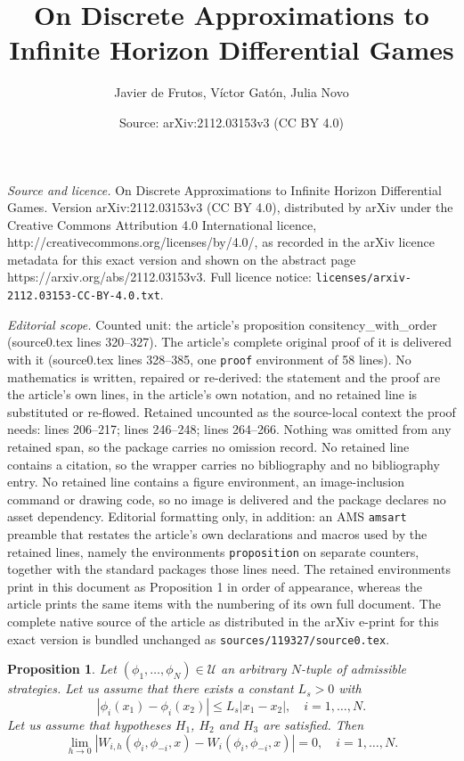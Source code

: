 \documentclass[10pt,a4paper]{amsart}
\title{On Discrete Approximations to Infinite Horizon Differential Games}
\author{Javier de Frutos, V\'ictor Gat\'on, Julia Novo}
\date{Source: arXiv:2112.03153v3 (CC BY 4.0)}
\newtheorem{proposition}{Proposition}
\begin{document}
\maketitle

\noindent\emph{Source and licence.} On Discrete Approximations to Infinite Horizon Differential Games. Version arXiv:2112.03153v3 (CC BY 4.0), distributed by arXiv under the Creative Commons Attribution 4.0 International licence, http://creativecommons.org/licenses/by/4.0/, as recorded in the arXiv licence metadata for this exact version and shown on the abstract page https://arxiv.org/abs/2112.03153v3. Full licence notice: \texttt{licenses/arxiv-2112.03153-CC-BY-4.0.txt}.\par\smallskip

\noindent\textit{Editorial scope.} Counted unit: the article's proposition consitency\_with\_order (source0.tex lines 320--327). The article's complete original proof of it is delivered with it (source0.tex lines 328--385, one \texttt{proof} environment of 58 lines). No mathematics is written, repaired or re-derived: the statement and the proof are the article's own lines, in the article's own notation, and no retained line is substituted or re-flowed.  Retained uncounted as the source-local context the proof needs: lines 206--217; lines 246--248; lines 264--266.  Nothing was omitted from any retained span, so the package carries no omission record.  No retained line contains a citation, so the wrapper carries no bibliography and no bibliography entry.  No retained line contains a figure environment, an image-inclusion command or drawing code, so no image is delivered and the package declares no asset dependency.  Editorial formatting only, in addition: an AMS \texttt{amsart} preamble that restates the article's own declarations and macros used by the retained lines, namely the environments \texttt{proposition} on separate counters, together with the standard packages those lines need.  The retained environments print in this document as Proposition 1 in order of appearance, whereas the article prints the same items with the numbering of its own full document.  The complete native source of the article as distributed in the arXiv e-print for this exact version is bundled unchanged as \texttt{sources/119327/source0.tex}.
\begin{proposition}\label{consistency}
Let  $(\phi_1,\dots,\phi_N)\in\mathcal{U}$ an arbitrary $N$-tuple of admissible strategies. Let us assume that there exists a constant $L_s>0$ with
\begin{equation}\label{lipschitz_strategies}
|\phi_i(x_1)-\phi_i(x_2)|\le L_s |x_1-x_2|,\quad i=1,\dots, N.
\end{equation}
Let us assume that hypotheses $H_1$, $H_2$ and $H_3$ are satisfied.
 Then
\begin{equation*}
\lim_{h\rightarrow 0} \left|W_{i,h}(\phi_{i},\phi_{-i},x)- W_i(\phi_{i},\phi_{-i},x)\right|=0,
\quad i=1,\dots,N.
\end{equation*}
\end{proposition}
\end{document}
